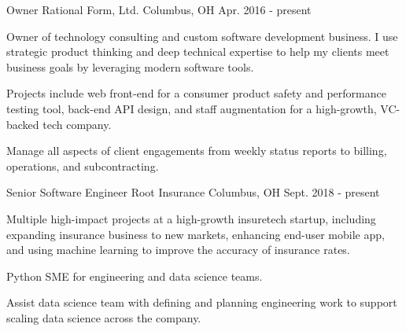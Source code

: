 

\begin{cventries}

  \cventry
    {Owner} %
    {Rational Form, Ltd.} %
    {Columbus, OH} %
    {Apr. 2016 - present} %
    {
      \begin{cvitems} %
        \item {Owner of technology consulting and custom software development business. I use strategic product thinking and deep technical expertise to help my clients meet business goals by leveraging modern software tools.}
        \item {Projects include web front-end for a consumer product safety and performance testing tool,
        back-end API design, and staff augmentation for a high-growth, VC-backed tech company.}
        \item {Manage all aspects of client engagements from weekly status reports to billing, operations,
        and subcontracting.}
      \end{cvitems}
    }

  \cventry
    {Senior Software Engineer} %
    {Root Insurance} %
    {Columbus, OH} %
    {Sept. 2018 - present} %
    {
      \begin{cvitems} %
        \item {Multiple high-impact projects at a high-growth insuretech startup,
          including expanding insurance business to new markets,
          enhancing end-user mobile app,
          and using machine learning to improve the accuracy of insurance rates.}
        \item {Python SME for engineering and data science teams.}
        \item {Assist data science team with defining and planning engineering work to support scaling data science across the company.}
      \end{cvitems}
    }


\end{cventries}
